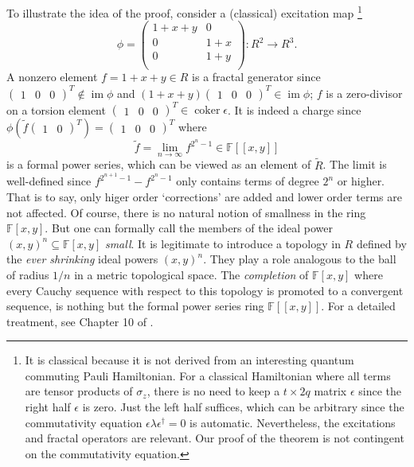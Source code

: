 \documentclass[letterpaper,12pt]{amsart}
\theoremstyle{definition} \newtheorem{defn}{Definition}
\theoremstyle{definition} \newtheorem{rem}{Remark}
\theoremstyle{definition} \newtheorem{example}{Example}
\newcommand{\im}{\mathop{\mathrm{im}}}
\newcommand{\coker}{\mathop{\mathrm{coker}}}
\newcommand{\FF}{\mathbb{F}}
\begin{document}
To illustrate the idea of the proof,
consider a (classical) excitation map%
\footnote{
It is classical because it is not derived from an interesting quantum commuting Pauli Hamiltonian.
For a classical Hamiltonian where all terms are tensor products of $\sigma_z$,
there is no need to keep a $t \times 2q$ matrix $\epsilon$
since the right half $\epsilon$ is zero.
Just the left half suffices, which can be arbitrary
since the commutativity equation $\epsilon \lambda \epsilon^\dagger =0$ is automatic.
Nevertheless, the excitations and fractal operators are relevant.
Our proof of the theorem is not contingent on the commutativity equation.
}
\[
 \phi =
 \begin{pmatrix}
  1+x+y & 0   \\
     0  & 1+x \\
     0  & 1+y \\
 \end{pmatrix}
 : R^2 \to R^3 .
\]
A nonzero element $f=1+x+y \in R$ is a fractal generator
since $\begin{pmatrix} 1 & 0 & 0 \end{pmatrix}^T \notin \im \phi$ 
and $(1+x+y)\begin{pmatrix} 1 & 0 & 0 \end{pmatrix}^T \in \im \phi$;
$f$ is a zero-divisor on a torsion element $\begin{pmatrix} 1 & 0 & 0 \end{pmatrix}^T \in \coker \epsilon$.
It is indeed a charge since 
$\phi(\tilde f \begin{pmatrix} 1 & 0 \end{pmatrix}^T) = \begin{pmatrix} 1 & 0 & 0 \end{pmatrix}^T$ where
\[
 \tilde f = \lim_{n \to \infty} f^{2^n-1} \in \FF[[x,y]]
\]
is a formal power series, which can be viewed as an element of $\tilde R$.
The limit is well-defined since $f^{2^{n+1}-1} - f^{2^n -1}$ only contains terms of degree $2^n$ or higher.
That is to say, only higer order `corrections' are added and lower order terms are not affected.
Of course, there is no natural notion of smallness in the ring $\FF[x,y]$.
But one can formally call the members of the ideal power $(x,y)^n \subseteq \FF[x,y]$ \emph{small}.
It is legitimate to introduce a topology in $R$ defined by the \emph{ever shrinking} ideal powers $(x,y)^n$.
They play a role analogous to the ball of radius $1/n$ in a metric topological space.
The \emph{completion} of $\FF[x,y]$
where every Cauchy sequence with respect to this topology is promoted to a convergent sequence,
is nothing but the formal power series ring $\FF[[x,y]]$.
For a detailed treatment, see Chapter 10 of \cite{AtiyahMacDonald}.
\end{document}
